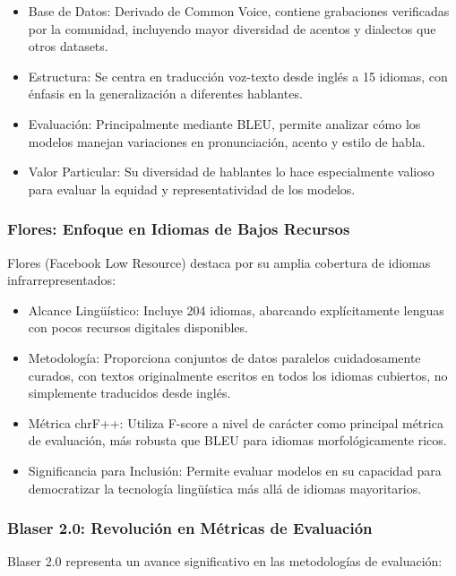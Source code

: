 \begin{itemize}
    \item Base de Datos: Derivado de Common Voice, contiene grabaciones verificadas por la comunidad, incluyendo mayor diversidad de acentos y dialectos que otros datasets.
    \item Estructura: Se centra en traducción voz-texto desde inglés a 15 idiomas, con énfasis en la generalización a diferentes hablantes.
    \item Evaluación: Principalmente mediante BLEU, permite analizar cómo los modelos manejan variaciones en pronunciación, acento y estilo de habla.
    \item Valor Particular: Su diversidad de hablantes lo hace especialmente valioso para evaluar la equidad y representatividad de los modelos.
\end{itemize}

\subsubsection{Flores: Enfoque en Idiomas de Bajos Recursos}
Flores (Facebook Low Resource) destaca por su amplia cobertura de idiomas infrarrepresentados:

\begin{itemize}
    \item Alcance Lingüístico: Incluye 204 idiomas, abarcando explícitamente lenguas con pocos recursos digitales disponibles.
    \item Metodología: Proporciona conjuntos de datos paralelos cuidadosamente curados, con textos originalmente escritos en todos los idiomas cubiertos, no simplemente traducidos desde inglés.
    \item Métrica chrF++: Utiliza F-score a nivel de carácter como principal métrica de evaluación, más robusta que BLEU para idiomas morfológicamente ricos.
    \item Significancia para Inclusión: Permite evaluar modelos en su capacidad para democratizar la tecnología lingüística más allá de idiomas mayoritarios.
\end{itemize}

\subsubsection{Blaser 2.0: Revolución en Métricas de Evaluación}
Blaser 2.0 representa un avance significativo en las metodologías de evaluación:


